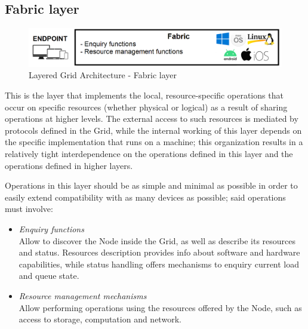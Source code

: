 \subsection{Fabric layer}
\begin{figure}[!ht]
    \centering
    \includegraphics[scale=0.35]{document/chapters/chapter_2/images/fabric_layer.png}
    \caption{Layered Grid Architecture - Fabric layer}
    \label{fig:fabric_layer}
\end{figure}

\noindent This is the layer that implements the local, resource-specific operations that occur on specific resources (whether physical or logical) as a result of sharing operations at higher levels. The external access to such resources is mediated by protocols defined in the Grid, while the internal working of this layer depends on the specific implementation that runs on a machine; this organization results in a relatively tight interdependence on the operations defined in this layer and the operations defined in higher layers.
\vspace{30mm}

Operations in this layer should be as simple and minimal as possible in order to easily extend compatibility with as many devices as possible; said operations must involve:
\begin{itemize}
    \item \textit{Enquiry functions}\\
    Allow to discover the Node inside the Grid, as well as describe its resources and status. Resources description provides info about software and hardware capabilities, while status handling offers mechanisms to enquiry current load and queue state.
    \item \textit{Resource management mechanisms}\\
    Allow performing operations using the resources offered by the Node, such as access to storage, computation and network.
\end{itemize} 
\vspace{5mm}

